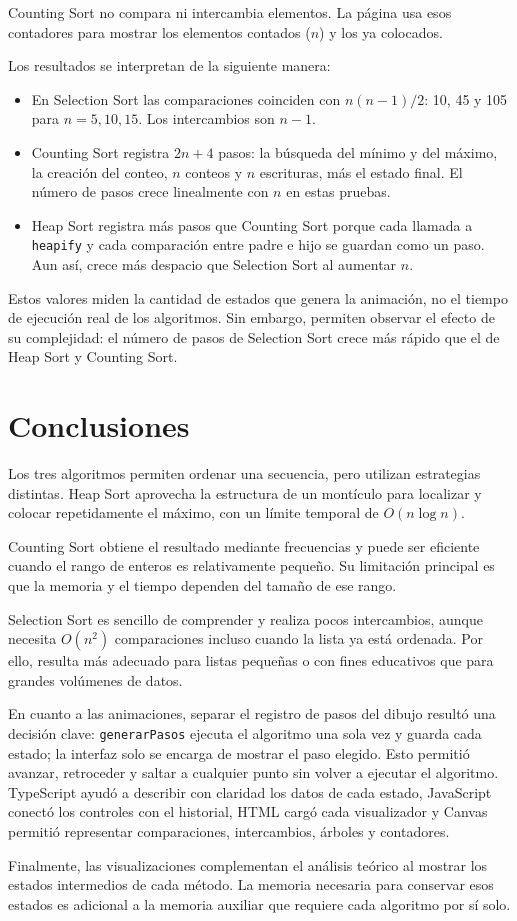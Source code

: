\documentclass[12pt,a4paper]{article}
\begin{document}
\noindent *Counting Sort no compara ni intercambia elementos. La página usa esos contadores para mostrar los elementos contados (\(n\)) y los ya colocados.

Los resultados se interpretan de la siguiente manera:

\begin{itemize}
    \item En Selection Sort las comparaciones coinciden con \(n(n-1)/2\): 10, 45 y 105 para \(n=5,10,15\). Los intercambios son \(n-1\).
    \item Counting Sort registra \(2n+4\) pasos: la búsqueda del mínimo y del máximo, la creación del conteo, \(n\) conteos y \(n\) escrituras, más el estado final. El número de pasos crece linealmente con \(n\) en estas pruebas.
    \item Heap Sort registra más pasos que Counting Sort porque cada llamada a \texttt{heapify} y cada comparación entre padre e hijo se guardan como un paso. Aun así, crece más despacio que Selection Sort al aumentar \(n\).
\end{itemize}

Estos valores miden la cantidad de estados que genera la animación, no el tiempo de ejecución real de los algoritmos. Sin embargo, permiten observar el efecto de su complejidad: el número de pasos de Selection Sort crece más rápido que el de Heap Sort y Counting Sort.

\section{Conclusiones}

Los tres algoritmos permiten ordenar una secuencia, pero utilizan estrategias distintas. Heap Sort aprovecha la estructura de un montículo para localizar y colocar repetidamente el máximo, con un límite temporal de \(O(n\log n)\).

Counting Sort obtiene el resultado mediante frecuencias y puede ser eficiente cuando el rango de enteros es relativamente pequeño. Su limitación principal es que la memoria y el tiempo dependen del tamaño de ese rango.

Selection Sort es sencillo de comprender y realiza pocos intercambios, aunque necesita \(O(n^2)\) comparaciones incluso cuando la lista ya está ordenada. Por ello, resulta más adecuado para listas pequeñas o con fines educativos que para grandes volúmenes de datos.

En cuanto a las animaciones, separar el registro de pasos del dibujo resultó una decisión clave: \texttt{generarPasos} ejecuta el algoritmo una sola vez y guarda cada estado; la interfaz solo se encarga de mostrar el paso elegido. Esto permitió avanzar, retroceder y saltar a cualquier punto sin volver a ejecutar el algoritmo. TypeScript ayudó a describir con claridad los datos de cada estado, JavaScript conectó los controles con el historial, HTML cargó cada visualizador y Canvas permitió representar comparaciones, intercambios, árboles y contadores.

Finalmente, las visualizaciones complementan el análisis teórico al mostrar los estados intermedios de cada método. La memoria necesaria para conservar esos estados es adicional a la memoria auxiliar que requiere cada algoritmo por sí solo.
\end{document}
